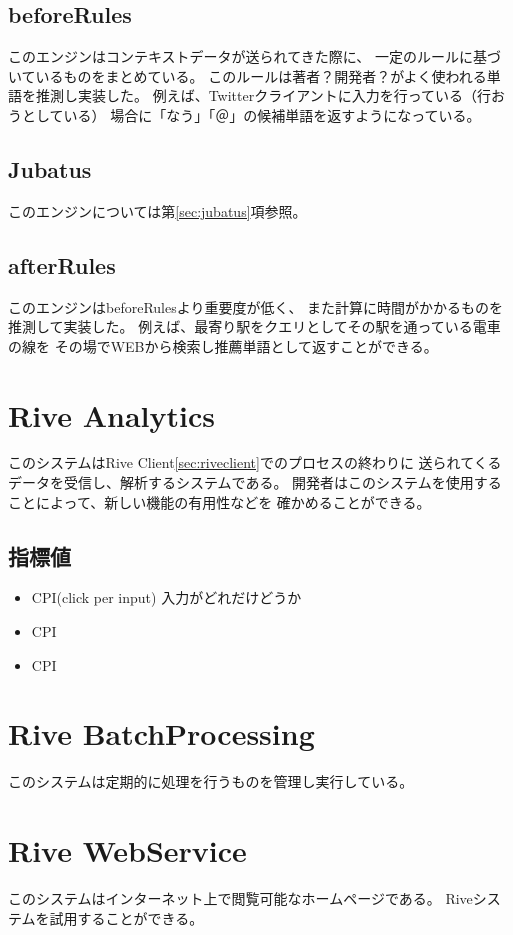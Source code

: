 \subsection{beforeRules}
このエンジンはコンテキストデータが送られてきた際に、
一定のルールに基づいているものをまとめている。
このルールは著者？開発者？がよく使われる単語を推測し実装した。
例えば、Twitter\cite{Twitter}クライアントに入力を行っている（行おうとしている）
場合に「なう」「＠」の候補単語を返すようになっている。

\subsection{Jubatus}
このエンジンについては第\ref{sec:jubatus}項参照。

\subsection{afterRules}
このエンジンはbeforeRulesより重要度が低く、
また計算に時間がかかるものを推測して実装した。
例えば、最寄り駅をクエリとしてその駅を通っている電車の線を
その場でWEBから検索し推薦単語として返すことができる。

\section{Rive Analytics}
このシステムはRive Client\ref{sec:riveclient}でのプロセスの終わりに
送られてくるデータを受信し、解析するシステムである。
開発者はこのシステムを使用することによって、新しい機能の有用性などを
確かめることができる。

\subsection{指標値}
\begin{itemize}
  \item CPI(click per input)
    入力がどれだけどうか
  \item CPI
  \item CPI
\end{itemize}

\section{Rive BatchProcessing}
このシステムは定期的に処理を行うものを管理し実行している。

\section{Rive WebService}
このシステムはインターネット上で閲覧可能なホームページである。
Riveシステムを試用することができる。

